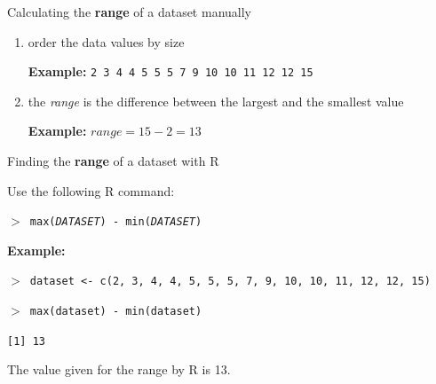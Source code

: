\begin{howto}{Calculating the \textbf{range} of a dataset manually}{
  \begin{enumerate}
  \item order the data values by size
    
    \textbf{\color{darkgray} Example:} \texttt{2 3 4 4 5 5 5 7 9 10 10 11 12 12 15}

  \item the \emph{range} is the difference between the largest and the smallest value
    
    \vspace{3ex}\textbf{\color{darkgray} Example:}  \texttt{$range = 15 - 2 = 13$}
  \end{enumerate}}
{Finding the \textbf{range} of a dataset with R}{
  Use the following R command:
  
  \texttt{$>$ max(\emph{DATASET}) - min(\emph{DATASET})}

  \textbf{\color{darkgray} Example:}

  \texttt{$>$ dataset <- c(2, 3, 4, 4, 5, 5, 5, 7, 9, 10, 10, 11, 12, 12, 15)}

  \texttt{$>$ max(dataset) - min(dataset)}

  \texttt{[1] 13}

  The value given for the range by R is 13.}
\end{howto}
